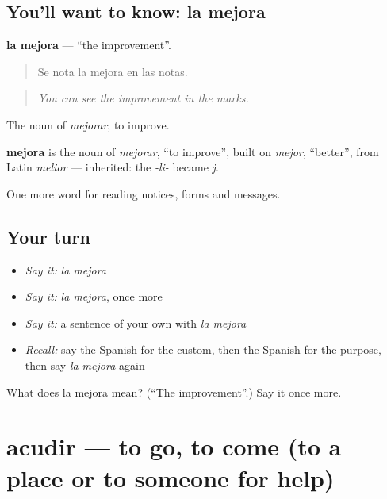 \subsection*{You'll want to know: la mejora}
\textbf{la mejora} — \textquotedblleft{}the improvement\textquotedblright{}.

\begin{quote}
Se nota la mejora en las notas.
\end{quote}

\begin{quote}
\emph{You can see the improvement in the marks.}
\end{quote}

The noun of \emph{mejorar}, to improve.

\begin{cousinweb}
\textbf{mejora} is the noun of \emph{mejorar}, \textquotedblleft{}to improve\textquotedblright{}, built on \emph{mejor}, \textquotedblleft{}better\textquotedblright{}, from Latin \emph{melior} — inherited: the \emph{-li-} became \emph{j}.
\end{cousinweb}

\begin{grammarlens}[title={What you've built}]
One more word for reading notices, forms and messages.
\end{grammarlens}

\subsection*{Your turn}
\begin{itemize}
\raggedright
  \item \emph{Say it:} \emph{la mejora}
  \item \emph{Say it:} \emph{la mejora}, once more
  \item \emph{Say it:} a sentence of your own with \emph{la mejora}
  \item \emph{Recall:} say the Spanish for the custom, then the Spanish for the purpose, then say \emph{la mejora} again
\end{itemize}

\begin{tcolorbox}[breakable,colback=teal!4,colframe=teal!35!black,title={Before you move on}]
What does la mejora mean? (\textquotedblleft{}The improvement\textquotedblright{}.) Say it once more.
\end{tcolorbox}
\section[acudir]{acudir — to go, to come (to a place or to someone for help)}

